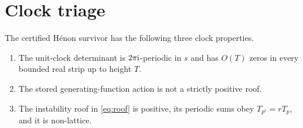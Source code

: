 \section{Clock triage}
\label{sec:clock}

\begin{theorem}
\label{thm:clock}
The certified H\'enon survivor has the following three clock properties.
\begin{enumerate}
  \item The unit-clock determinant is \(2\pi\mathrm{i}\)-periodic in \(s\) and has
  \(O(T)\) zeros in every bounded real strip up to height \(T\).
  \item The stored generating-function action is not a strictly positive roof.
  \item The instability roof in \eqref{eq:roof} is positive, its periodic sums
  obey \(T_{p^r}=rT_p\), and it is non-lattice.
\end{enumerate}
\end{theorem}

